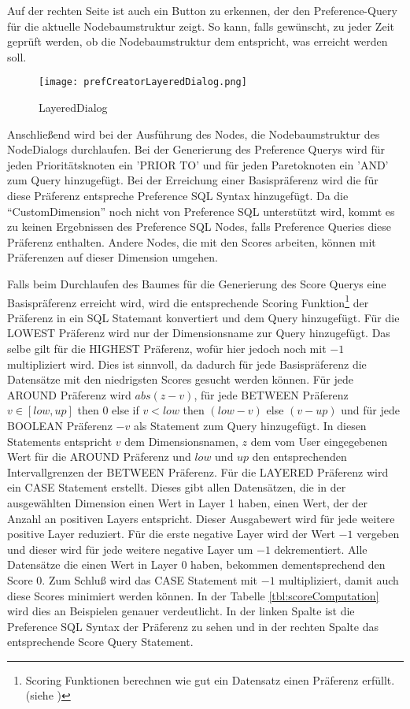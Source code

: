 Auf der rechten Seite ist auch ein Button zu erkennen, der den Preference-Query für die aktuelle Nodebaumstruktur zeigt. So kann, falls gewünscht, zu jeder Zeit geprüft werden, ob die Nodebaumstruktur dem entspricht, was erreicht werden soll. 

\begin{figure}[H]
	\centering
	\texttt{[image: prefCreatorLayeredDialog.png]}
	\caption{LayeredDialog}
	\label{img:prefCreatorLayeredDialog}
\end{figure}

Anschließend wird bei der Ausführung des Nodes, die Nodebaumstruktur des NodeDialogs durchlaufen.
Bei der Generierung des Preference Querys wird für jeden Prioritätsknoten ein 'PRIOR TO' und für jeden Paretoknoten ein 'AND' zum Query hinzugefügt. Bei der Erreichung einer Basispräferenz wird die für diese Präferenz entspreche Preference SQL Syntax hinzugefügt. Da die \enquote{CustomDimension} noch nicht von Preference SQL unterstützt wird, kommt es zu keinen Ergebnissen des Preference SQL Nodes, falls Preference Queries diese Präferenz enthalten. Andere Nodes, die mit den Scores arbeiten, können mit Präferenzen auf dieser Dimension umgehen. 

Falls beim Durchlaufen des Baumes für die Generierung des Score Querys eine Basispräferenz erreicht wird, wird die entsprechende Scoring Funktion\footnote{Scoring Funktionen berechnen wie gut ein Datensatz einen Präferenz erfüllt. (siehe \cite{kiessling2002foundations})} der Präferenz in ein SQL Statemant konvertiert und dem Query hinzugefügt. Für die LOWEST Präferenz wird nur der Dimensionsname zur Query hinzugefügt. Das selbe gilt für die HIGHEST Präferenz, wofür hier jedoch noch mit $-1$ multipliziert wird. Dies ist sinnvoll, da dadurch für jede Basispräferenz die Datensätze mit den niedrigsten Scores gesucht werden können. Für jede AROUND Präferenz wird $abs(z-v)$, für jede BETWEEN Präferenz $v \in{[low, up]}$ then $0$ else if $v < low$ then $(low - v)$ else $(v - up)$ und für jede BOOLEAN Präferenz $-v$ als Statement zum Query hinzugefügt. In diesen Statements entspricht $v$ dem Dimensionsnamen, $z$ dem vom User eingegebenen Wert für die AROUND Präferenz und $low$ und $up$ den entsprechenden Intervallgrenzen der BETWEEN Präferenz. 
Für die LAYERED Präferenz wird ein CASE Statement erstellt. Dieses gibt allen Datensätzen, die in der ausgewählten Dimension einen Wert in Layer 1 haben, einen Wert, der der Anzahl an positiven Layers  entspricht. Dieser Ausgabewert wird für jede weitere positive Layer reduziert. Für die erste negative Layer wird der Wert $-1$ vergeben und dieser wird für jede weitere negative Layer um $-1$ dekrementiert. Alle Datensätze die einen Wert in Layer 0 haben, bekommen dementsprechend den Score 0. Zum Schluß wird das CASE Statement mit $-1$ multipliziert, damit auch diese Scores minimiert werden können.
In der Tabelle \ref{tbl:scoreComputation} wird dies an Beispielen genauer verdeutlicht. In der linken Spalte ist die Preference SQL Syntax der Präferenz zu sehen und in der rechten Spalte das entsprechende Score Query Statement. 

